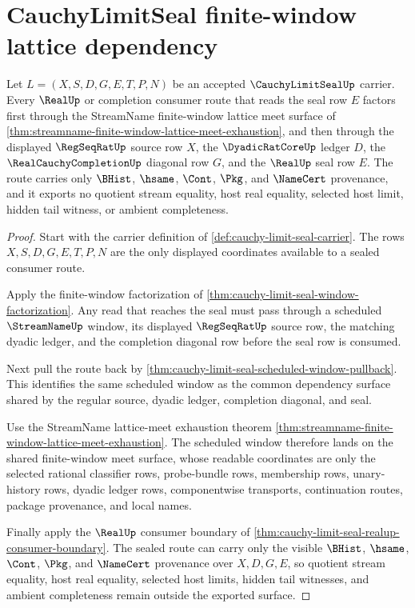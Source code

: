 \section{CauchyLimitSeal finite-window lattice dependency}
\label{sec:cauchy-limit-seal-finite-window-lattice-dependency}

\begin{theorem}
\label{thm:cauchy-limit-seal-finite-window-lattice-dependency}
Let $L=(X,S,D,G,E,T,P,N)$ be an accepted $\CauchyLimitSealUp$ carrier. Every $\RealUp$ or completion consumer route that reads the seal row $E$ factors first through the StreamName finite-window lattice meet surface of \autoref{thm:streamname-finite-window-lattice-meet-exhaustion}, and then through the displayed $\RegSeqRatUp$ source row $X$, the $\DyadicRatCoreUp$ ledger $D$, the $\RealCauchyCompletionUp$ diagonal row $G$, and the $\RealUp$ seal row $E$. The route carries only $\BHist$, $\hsame$, $\Cont$, $\Pkg$, and $\NameCert$ provenance, and it exports no quotient stream equality, host real equality, selected host limit, hidden tail witness, or ambient completeness.
\end{theorem}
\begin{proof}
Start with the carrier definition of \autoref{def:cauchy-limit-seal-carrier}. The rows $X,S,D,G,E,T,P,N$ are the only displayed coordinates available to a sealed consumer route.

Apply the finite-window factorization of \autoref{thm:cauchy-limit-seal-window-factorization}. Any read that reaches the seal must pass through a scheduled $\StreamNameUp$ window, its displayed $\RegSeqRatUp$ source row, the matching dyadic ledger, and the completion diagonal row before the seal row is consumed.

Next pull the route back by \autoref{thm:cauchy-limit-seal-scheduled-window-pullback}. This identifies the same scheduled window as the common dependency surface shared by the regular source, dyadic ledger, completion diagonal, and seal.

Use the StreamName lattice-meet exhaustion theorem \autoref{thm:streamname-finite-window-lattice-meet-exhaustion}. The scheduled window therefore lands on the shared finite-window meet surface, whose readable coordinates are only the selected rational classifier rows, probe-bundle rows, membership rows, unary-history rows, dyadic ledger rows, componentwise transports, continuation routes, package provenance, and local names.

Finally apply the $\RealUp$ consumer boundary of \autoref{thm:cauchy-limit-seal-realup-consumer-boundary}. The sealed route can carry only the visible $\BHist$, $\hsame$, $\Cont$, $\Pkg$, and $\NameCert$ provenance over $X,D,G,E$, so quotient stream equality, host real equality, selected host limits, hidden tail witnesses, and ambient completeness remain outside the exported surface.
\end{proof}

